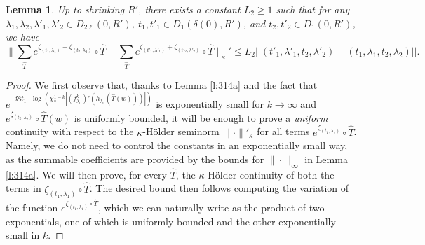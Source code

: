 \documentclass[11pt]{amsart}
\theoremstyle{plain}
\newtheorem{lem}[thm]{Lemma}
\theoremstyle{definition}
\theoremstyle{remark}
\begin{document}
\begin{lem}\label{l:314b}
Up to shrinking $R'$,
there exists a constant $L_2 \ge 1$ such that for any $\lambda_1,\lambda_2,\lambda'_1, \lambda'_2
\in D_{2\ell}(0,R')$,
$t_1,t'_1 \in D_1(  \delta(0),R')$,
 and 
 $t_2,t'_2 \in D_1(0,R')$,
we have
$$\Big\|\sum_{\hat T} e^{\zeta_{(t_1,\lambda_1)}
+
\zeta_{(t_2,\lambda_2)}
} \circ \hat{T}- \sum_{\hat T} e^{\zeta_{(t'_1,\lambda'_1)}+
\zeta_{(t'_2,\lambda'_2)}} \circ \hat{T}\Big\|_\kappa' \le L_2||(t'_1,\lambda'_1, t_2, \lambda'_2)
-(t_1,\lambda_1, t_2, \lambda_2)||.$$
\end{lem}

\begin{proof}
We first observe that, thanks to 
Lemma \ref{l:314a}
and the fact that
$e^{- \Re t_1 \cdot \log(\chi_*^{1-k}|(f^k_{\lambda_0})' (h_{\lambda_0}(\hat{T}(w)))|)} $ is 
exponentially small
for $k\to \infty$
and 
$e^{\zeta_{(t_2,\lambda_2)}}\circ \hat T(w)$ is  
uniformly bounded,
it will be enough to prove a \emph{uniform}
continuity with respect to the $\kappa$-H\"older seminorm $\|\cdot\|'_\kappa$ for all terms
$e^{\zeta_{(t_1,\lambda_1)}} \circ \hat{T}$. Namely, we do not need to control the constants in an exponentially small way, as the summable coefficients are provided by the 
bounds for $\|\cdot\|_\infty$ in 
Lemma \ref{l:314a}.
We will then prove, for every $\hat T$,
the $\kappa$-H\"older continuity of both 
the terms in $\zeta_{(t_1,\lambda_1)}\circ \hat T$. The desired bound then follows computing 
the variation of the function $e^{\zeta_{(t_1,\lambda_1)}\circ \hat T}$, which we can naturally write as the product of two exponentials, one of which 
is uniformly bounded and the other
exponentially small in $k$.

\medskip


\end{proof}
\end{document}
